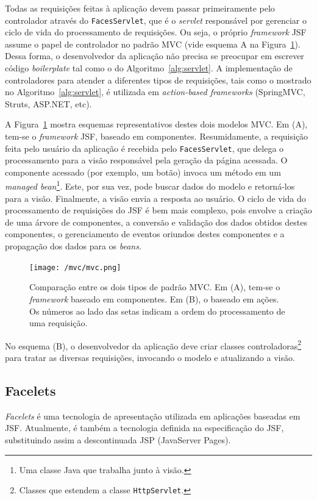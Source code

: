 \documentclass[
  10.5pt,				  %
	openright,			%
	twoside,			  %
  a5paper,
  chapter=TITLE,	%
	section=TITLE,	%
  hyphens,        %
	english,        %
	brazil          %
]{abntex2}
\begin{document}
Todas as requisições feitas à aplicação devem passar primeiramente pelo controlador através do \texttt{FacesServlet}, que é o \emph{servlet} responsável por gerenciar o ciclo de vida do processamento de requisições. Ou seja, o próprio \emph{framework} JSF assume o papel de controlador no padrão MVC (vide esquema A na Figura~\ref{fig:mvc}). Dessa forma, o desenvolvedor da aplicação não precisa se preocupar em escrever código \emph{boilerplate} tal como o do Algoritmo~\ref{alg:servlet}.
A implementação de controladores para atender a diferentes tipos de requisições, tais como o mostrado no Algoritmo~\ref{alg:servlet}, é utilizada em \emph{action-based frameworks} (SpringMVC, Struts, ASP.NET, etc).

A Figura~\ref{fig:mvc} mostra esquemas representativos destes dois modelos MVC. Em (A), tem-se o \emph{framework} JSF, baseado em componentes. Resumidamente, a requisição feita pelo usuário da aplicação é recebida pelo \texttt{FacesServlet}, que delega o processamento para a visão responsável pela geração da página acessada. O componente acessado (por exemplo, um botão) invoca um método em um \emph{managed bean}\footnote{Uma classe Java que trabalha junto à visão.}. Este, por sua vez, pode buscar dados do modelo e retorná-los para a visão. Finalmente, a visão envia a resposta ao usuário. O ciclo de vida do processamento de requisições do JSF é bem mais complexo, pois envolve a criação de uma árvore de componentes, a conversão e validação dos dados obtidos destes componentes, o gerenciamento de eventos oriundos destes componentes e a propagação dos dados para os \emph{beans}.

\begin{figure}[!ht]
  \caption{\label{fig:mvc}Comparação entre os dois tipos de padrão MVC. Em (A), tem-se o \emph{framework} baseado em componentes. Em (B), o baseado em ações. Os números ao lado das setas indicam a ordem do processamento de uma requisição.}
  \begin{center}
    \texttt{[image: /mvc/mvc.png]}
  \end{center}
\end{figure}

No esquema (B), o desenvolvedor da aplicação deve criar classes controladoras\footnote{Classes que estendem a classe \texttt{HttpServlet}.} para tratar as diversas requisições, invocando o modelo e atualizando a visão. 



\subsection{Facelets}\label{sec:facelets}
\emph{Facelets} é uma tecnologia de apresentação utilizada em aplicações baseadas em JSF. Atualmente, é também a tecnologia definida na especificação do JSF, substituindo assim a descontinuada JSP (JavaServer Pages).
\end{document}
